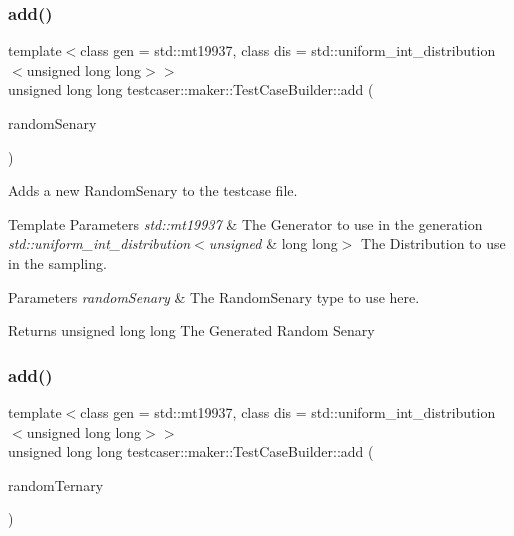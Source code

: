 \subsubsection{\texorpdfstring{add()}{add()}\hspace{0.1cm}{\footnotesize\ttfamily [8/11]}}
{\footnotesize\ttfamily template$<$class gen  = std\+::mt19937, class dis  = std\+::uniform\+\_\+int\+\_\+distribution$<$unsigned long long$>$$>$ \\
unsigned long long testcaser\+::maker\+::\+Test\+Case\+Builder\+::add (\begin{DoxyParamCaption}\item[{\mbox{\hyperlink{structtestcaser_1_1maker_1_1types_1_1RandomSenary}{types\+::\+Random\+Senary}}$<$ gen, dis $>$ \&}]{random\+Senary }\end{DoxyParamCaption})\hspace{0.3cm}{\ttfamily [inline]}}



Adds a new Random\+Senary to the testcase file. 


\begin{DoxyTemplParams}{Template Parameters}
{\em std\+::mt19937} & The Generator to use in the generation \\
\hline
{\em std\+::uniform\+\_\+int\+\_\+distribution$<$unsigned} & long long$>$ The Distribution to use in the sampling. \\
\hline
\end{DoxyTemplParams}

\begin{DoxyParams}{Parameters}
{\em random\+Senary} & The Random\+Senary type to use here. \\
\hline
\end{DoxyParams}
\begin{DoxyReturn}{Returns}
unsigned long long The Generated Random Senary 
\end{DoxyReturn}
\mbox{\label{classtestcaser_1_1maker_1_1TestCaseBuilder_a4bab625f6da4431125ca3e9eb602eaad}} 
\subsubsection{\texorpdfstring{add()}{add()}\hspace{0.1cm}{\footnotesize\ttfamily [9/11]}}
{\footnotesize\ttfamily template$<$class gen  = std\+::mt19937, class dis  = std\+::uniform\+\_\+int\+\_\+distribution$<$unsigned long long$>$$>$ \\
unsigned long long testcaser\+::maker\+::\+Test\+Case\+Builder\+::add (\begin{DoxyParamCaption}\item[{\mbox{\hyperlink{structtestcaser_1_1maker_1_1types_1_1RandomTernary}{types\+::\+Random\+Ternary}}$<$ gen, dis $>$ \&}]{random\+Ternary }\end{DoxyParamCaption})\hspace{0.3cm}{\ttfamily [inline]}}



